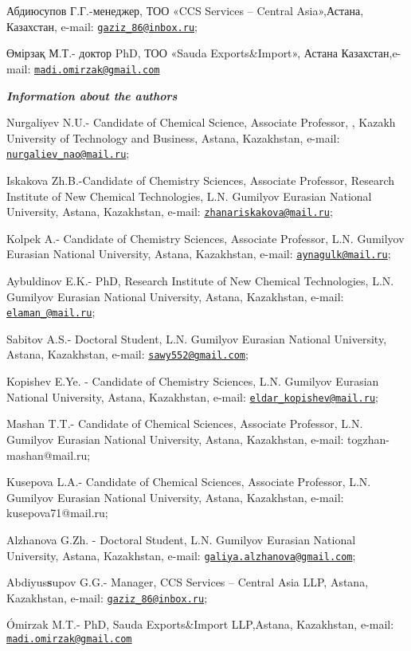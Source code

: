 Абдиюсупов Г.Г.-менеджер, ТОО «CCS Services -- Central Asia»,Астана,
Казахстан, e-mail:
\href{mailto:gaziz_86@inbox.ru}{\nolinkurl{gaziz\_86@inbox.ru}};

Өмірзақ М.Т.- доктор PhD, ТОО «Sauda Exports\&Import», Астана
Казахстан,e-mail:
\href{mailto:madi.omirzak@gmail.com}{\nolinkurl{madi.omirzak@gmail.com}}

\emph{{\bfseries Information about the authors}}

Nurgaliyev N.U.- Candidate of Chemical Science, Associate Professor, ,
Kazakh University of Technology and Business, Astana, Kazakhstan,
e-mail:
\href{mailto:nurgaliev_nao@mail.ru}{\nolinkurl{nurgaliev\_nao@mail.ru}};

Iskakova Zh.B.-Candidate of Chemistry Sciences, Associate Professor,
Research Institute of New Chemical Technologies, L.N. Gumilyov Eurasian
National University, Astana, Kazakhstan, e-mail:
\href{mailto:zhanariskakova@mail.ru}{\nolinkurl{zhanariskakova@mail.ru}};

Kolpek A.- Candidate of Chemistry Sciences, Associate Professor, L.N.
Gumilyov Eurasian National University, Astana, Kazakhstan, e-mail:
\href{mailto:aynagulk@mail.ru}{\nolinkurl{aynagulk@mail.ru}};

Aybuldinov E.K.- PhD, Research Institute of New Chemical Technologies,
L.N. Gumilyov Eurasian National University, Astana, Kazakhstan, e-mail:
\href{mailto:elaman_@mail.ru}{\nolinkurl{elaman\_@mail.ru}};

Sabitov A.S.- Doctoral Student, L.N. Gumilyov Eurasian National
University, Astana, Kazakhstan, e-mail:
\href{mailto:sawy552@gmail.com}{\nolinkurl{sawy552@gmail.com}};

Kopishev E.Ye. - Candidate of Chemistry Sciences, L.N. Gumilyov Eurasian
National University, Astana, Kazakhstan, e-mail:
\href{mailto:eldar_kopishev@mail.ru}{\nolinkurl{eldar\_kopishev@mail.ru}};

Mashan T.T.- Candidate of Chemical Sciences, Associate Professor, L.N.
Gumilyov Eurasian National University, Astana, Kazakhstan, e-mail:
togzhan-mashan@mail.ru;

Kusepova L.A.- Candidate of Chemical Sciences, Associate Professor, L.N.
Gumilyov Eurasian National University, Astana, Kazakhstan, e-mail:
kusepova71@mail.ru;

Alzhanova G.Zh. - Doctoral Student, L.N. Gumilyov Eurasian National
University, Astana, Kazakhstan, e-mail:
\href{mailto:galiya.alzhanova@gmail.com}{\nolinkurl{galiya.alzhanova@gmail.com}};

Abdiyus{\bfseries s}upov G.G.- Manager, CCS Services -- Central Asia LLP,
Astana, Kazakhstan, e-mail:
\href{mailto:gaziz_86@inbox.ru}{\nolinkurl{gaziz\_86@inbox.ru}};

Ómirzak M.T.- PhD, Sauda Exports\&Import LLP,Astana, Kazakhstan, e-mail:
\href{mailto:madi.omirzak@gmail.com}{\nolinkurl{madi.omirzak@gmail.com}}